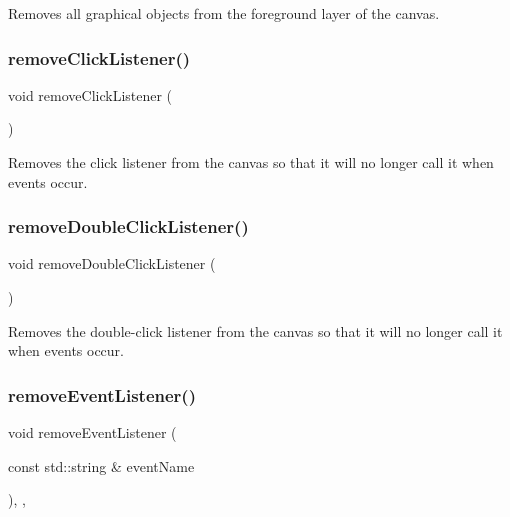 Removes all graphical objects from the foreground layer of the canvas. 

\mbox{\label{classGCanvas_ad39d0325cde6b97ebda4b9d7787c633b}} 
\subsubsection{\texorpdfstring{remove\+Click\+Listener()}{removeClickListener()}}
{\footnotesize\ttfamily void remove\+Click\+Listener (\begin{DoxyParamCaption}{ }\end{DoxyParamCaption})\hspace{0.3cm}{\ttfamily [virtual]}}



Removes the click listener from the canvas so that it will no longer call it when events occur. 

\mbox{\label{classGCanvas_aa4250907e4cdd77349c04f0cf5cdd3d3}} 
\subsubsection{\texorpdfstring{remove\+Double\+Click\+Listener()}{removeDoubleClickListener()}}
{\footnotesize\ttfamily void remove\+Double\+Click\+Listener (\begin{DoxyParamCaption}{ }\end{DoxyParamCaption})\hspace{0.3cm}{\ttfamily [virtual]}}



Removes the double-\/click listener from the canvas so that it will no longer call it when events occur. 

\mbox{\label{classGObservable_acbcf1ed3a851ad8a3c17ef38d86b481d}} 
\subsubsection{\texorpdfstring{remove\+Event\+Listener()}{removeEventListener()}}
{\footnotesize\ttfamily void remove\+Event\+Listener (\begin{DoxyParamCaption}\item[{const std\+::string \&}]{event\+Name }\end{DoxyParamCaption})\hspace{0.3cm}{\ttfamily [protected]}, {\ttfamily [virtual]}, {\ttfamily [inherited]}}



